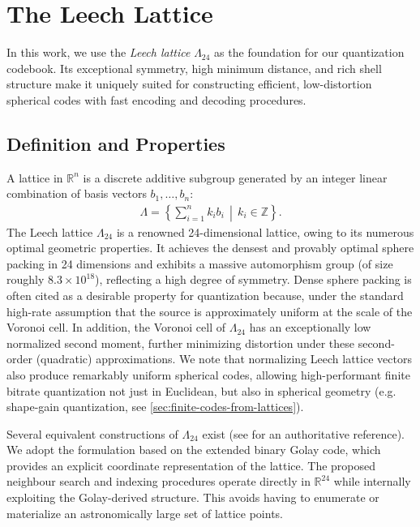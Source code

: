 \documentclass{article}
\theoremstyle{plain}
\theoremstyle{definition}
\theoremstyle{remark}
\begin{document}
\section{The Leech Lattice}

In this work, we use the \emph{Leech lattice} \(\Lambda_{24}\) as the foundation for our quantization codebook. Its exceptional symmetry, high minimum distance, and rich shell structure make it uniquely suited for constructing efficient, low-distortion spherical codes with fast encoding and decoding procedures.

\subsection{Definition and Properties}

A lattice in \(\mathbb{R}^n\) is a discrete additive subgroup generated by an integer linear combination of basis vectors \(b_1,\dots,b_n\):
{\setlength{\abovedisplayskip}{4pt}
\setlength{\belowdisplayskip}{4pt}
\setlength{\abovedisplayshortskip}{0pt}
\setlength{\belowdisplayshortskip}{1pt} %
\setlength{\jot}{3pt} %
\begin{align}
\Lambda = \left\{ \sum_{i=1}^n k_i b_i \,\middle|\, k_i\in\mathbb{Z} \right\}.
\end{align}
}
\noindent The Leech lattice \(\Lambda_{24}\) is a renowned 24-dimensional lattice, owing to its numerous optimal geometric properties. It achieves the densest and provably optimal sphere packing in 24 dimensions and exhibits a massive automorphism group (of size roughly \(8.3\times 10^{18}\)), reflecting a high degree of symmetry. Dense sphere packing is often cited as a desirable property for quantization because, under the standard high-rate assumption that the source is approximately uniform at the scale of the Voronoi cell. In addition, the Voronoi cell of \(\Lambda_{24}\) has an exceptionally low normalized second moment, further minimizing distortion under these second-order (quadratic) approximations. We note that normalizing Leech lattice vectors also produce remarkably uniform spherical codes, allowing high-performant finite bitrate quantization not just in Euclidean, but also in spherical geometry (e.g. shape-gain quantization, see \autoref{sec:finite-codes-from-lattices}).

Several equivalent constructions of $\Lambda_{24}$ exist (see \citealp{conway2013sphere} for an authoritative reference). We adopt the formulation based on the extended binary Golay code, which provides an explicit coordinate representation of the lattice. The proposed neighbour search and indexing procedures operate directly in $\mathbb{R}^{24}$ while internally exploiting the Golay-derived structure. This avoids having to enumerate or materialize an astronomically large set of lattice points.
\end{document}

